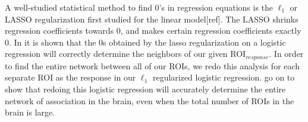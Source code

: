 \documentclass[12pt]{article}
\begin{document}
A well-studied statistical method to find 0's in regression equations is the $\ell_1$ or LASSO regularization first studied for the linear model[ref].  The LASSO shrinks regression coefficients towards 0, and makes certain regression coefficients exactly 0.  In \cite{ravikumar2010high} it is shown that the 0s obtained by the lasso regularization on a logistic regression will correctly determine the neighbors of our given ROI$_{response}$.  In order to find the entire network between all of our ROIs, we redo this analysis for each separate ROI as the response in our $\ell_1$ regularized logistic regression.  \cite{ravikumar2010high} go on to show that redoing this logistic regression will accurately determine the entire network of association in the brain, even when the total number of ROIs in the brain is large.



\end{document}
